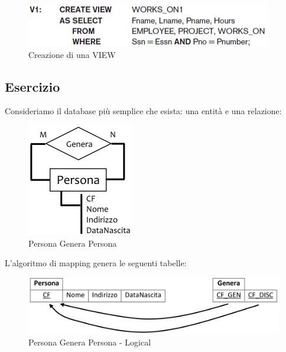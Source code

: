 \begin{center}
\begin{figure}[H]
\centering
\includegraphics[scale=1]{figures/create_view.png}
\caption{Creazione di una VIEW} 
\end{figure}
\end{center}


\subsection{Esercizio}

Consideriamo il database più semplice che esista: una entità e una relazione:

\begin{center}
\begin{figure}[H]
\centering
\includegraphics[scale=1]{figures/persona_genera_persona.png}
\caption{Persona Genera Persona} 
\end{figure}
\end{center}

L’algoritmo di mapping genera le seguenti tabelle:

\begin{center}
\begin{figure}[H]
\centering
\includegraphics[scale=1]{figures/pgp_logical.png}
\caption{Persona Genera Persona - Logical} 
\end{figure}
\end{center}

